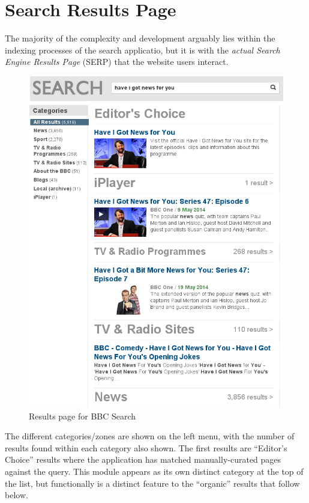 \section{Search Results Page}

The majority of the complexity and development arguably lies within
the indexing processes of the search applicatio, but it is with the
\emph{actual Search Engine Results Page} (SERP) that the website users interact.

\begin{figure}
  \begin{center}
    \includegraphics[width=\linewidth]{results-page.png}
  \end{center}
  \caption{Results page for BBC Search}
  \label{fig:search-page}
\end{figure}

The different categories/zones are shown on the left menu, with the
number of results found within each category also shown. The first results
are ``Editor's Choice'' results where the application
has matched manually-curated pages against the query. This module appears
as its own distinct category at the top of the list, but functionally
is a distinct feature to the ``organic'' results that follow below.

